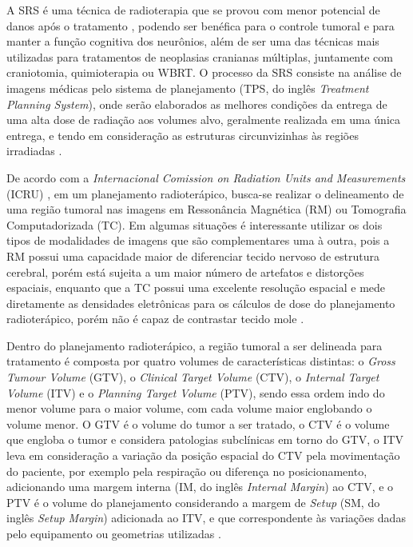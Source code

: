 A SRS é uma técnica de radioterapia que se provou com menor potencial de danos após o tratamento \cite{Tsao:2012}, podendo ser benéfica para o controle tumoral e para manter a função cognitiva dos neurônios, além de ser uma das técnicas mais utilizadas para tratamentos de neoplasias cranianas múltiplas, juntamente com craniotomia, quimioterapia ou WBRT.  O processo da SRS consiste na análise de imagens médicas pelo sistema de planejamento (TPS, do inglês \textit{Treatment Planning System}), onde serão elaborados as melhores condições da entrega  de uma alta dose de radiação aos volumes alvo, geralmente realizada em uma única entrega, e tendo em consideração as estruturas circunvizinhas às regiões irradiadas \cite{Bibault:2021}.

De acordo com a \textit{Internacional Comission on Radiation Units and Measurements} (ICRU) \cite{icru50:2015}, em um planejamento radioterápico, busca-se realizar o delineamento de uma região tumoral nas imagens em Ressonância Magnética (RM) ou Tomografia Computadorizada (TC). Em algumas situações é interessante utilizar os dois tipos de modalidades de imagens que são complementares uma à outra, pois a RM possui uma capacidade maior de diferenciar tecido nervoso de estrutura cerebral, porém está sujeita a um maior número de artefatos e distorções espaciais, enquanto que a TC possui uma excelente resolução espacial e mede diretamente as densidades eletrônicas para os cálculos de dose do planejamento radioterápico, porém não é capaz de contrastar tecido mole \cite{Hu:2019}.

Dentro do planejamento radioterápico, a região tumoral a ser delineada para tratamento é composta por quatro volumes de características distintas: o \textit{Gross Tumour Volume} (GTV), o \textit{Clinical Target Volume} (CTV), o \textit{Internal Target Volume} (ITV) e o \textit{Planning Target Volume} (PTV), sendo essa ordem indo do menor volume para o maior volume, com cada volume maior englobando o volume menor. O GTV é o volume do tumor a ser tratado, o CTV é o volume que engloba o tumor e considera patologias subclínicas em torno do GTV, o ITV leva em consideração a variação da posição espacial do CTV pela movimentação do paciente, por exemplo pela respiração ou diferença no posicionamento, adicionando uma margem interna (IM, do inglês \textit{Internal Margin}) ao CTV, e o PTV é o volume do planejamento considerando a margem de \textit{Setup} (SM, do inglês \textit{Setup Margin}) adicionada ao ITV, e que correspondente às variações dadas pelo equipamento ou geometrias utilizadas \cite{Mackie:2023}.

